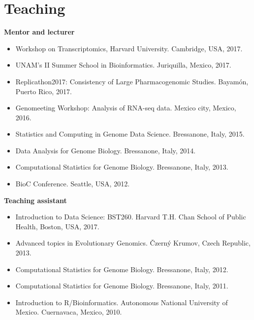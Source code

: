 \documentclass[11pt,a4paper,sans]{moderncv} %
\begin{document}
\vspace{-.2cm}
\section{Teaching}
\vspace{-.1cm}
\textbf{Mentor and lecturer}
\begin{itemize}
\item Workshop on Transcriptomics, Harvard University. Cambridge, USA, 2017. 
\item UNAM's II Summer School in Bioinformatics. Juriquilla, Mexico, 2017. 
\item Replicathon2017: Consistency of Large Pharmacogenomic Studies. Bayam\'on, Puerto Rico, 2017.
\item Genomeeting Workshop: Analysis of RNA-seq data. Mexico city, Mexico, 2016.
\item Statistics and Computing in Genome Data Science. Bressanone, Italy, 2015.
\item Data Analysis for Genome Biology. Bressanone, Italy, 2014.
\item Computational Statistics for Genome Biology. Bressanone, Italy, 2013.
\item BioC Conference. Seattle, USA, 2012.
\end{itemize}
\vspace{.1cm}
\textbf{Teaching assistant}
\begin{itemize}
\item Introduction to Data Science: BST260. Harvard T.H. Chan School of Public Health, Boston, USA, 2017. 
\item Advanced topics in Evolutionary Genomics. {\v C}zern\'y  Krumov, Czech Republic, 2013.
\item Computational Statistics for Genome Biology. Bressanone, Italy, 2012. 
\item Computational Statistics for Genome Biology. Bressanone, Italy, 2011. 
\item Introduction to R/Bioinformatics. Autonomous National University of Mexico. Cuernavaca, Mexico, 2010.
\end{itemize}

\end{document}
